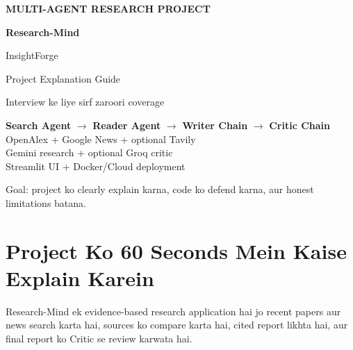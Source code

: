 \documentclass[11pt,a4paper]{article}
\begin{document}
\begin{titlepage}
  \pagecolor{Soft}
  \begin{center}
    \vspace*{25mm}
    {\large\color{Brand}\bfseries MULTI-AGENT RESEARCH PROJECT}\par
    \vspace{8mm}
    {\fontsize{38}{44}\selectfont\color{Ink}\bfseries Research-Mind}\par
    \vspace{3mm}
    {\fontsize{22}{27}\selectfont\color{BrandDark}InsightForge}\par
    \vspace{10mm}
    {\Large Project Explanation Guide}\par
    \vspace{3mm}
    {\large Interview ke liye sirf zaroori coverage}\par

    \vspace{18mm}
    \begin{tcolorbox}[width=.86\textwidth,colback=white,colframe=Line,arc=3mm]
      \centering
      \textbf{Search Agent} $\rightarrow$ \textbf{Reader Agent}
      $\rightarrow$ \textbf{Writer Chain} $\rightarrow$ \textbf{Critic Chain}\\[3mm]
      OpenAlex + Google News + optional Tavily\\
      Gemini research + optional Groq critic\\
      Streamlit UI + Docker/Cloud deployment
    \end{tcolorbox}

    \vfill
    {\color{Muted}Goal: project ko clearly explain karna, code ko defend karna, aur honest limitations batana.}
  \end{center}
\end{titlepage}
\nopagecolor

\tableofcontents
\newpage

\section{Project Ko 60 Seconds Mein Kaise Explain Karein}

\begin{keybox}
Research-Mind ek evidence-based research application hai jo recent papers aur news search karta hai, sources ko compare karta hai, cited report likhta hai, aur final report ko Critic se review karwata hai.
\end{keybox}
\end{document}

